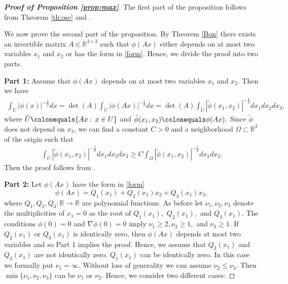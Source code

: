 \documentclass[a4paper, 11pt]{article}
\theoremstyle{plain}
\theoremstyle{definition}
\theoremstyle{lemma}
\theoremstyle{Remark}
\theoremstyle{proposition}
\theoremstyle{corollary}
\theoremstyle{example}
\theoremstyle{assumption}
\begin{document}
 \begin{proof}[\textbf{Proof of Proposition \ref{prop:max}}]
 The first part of the proposition follows from Theorem \ref{th:osc} and \cite[Theorem 1.12]{I.K.M}.


We now prove the second part of the proposition. By Theorem \ref{Bon} there exists an invertible matrix $A\in \mathbb{R}^{3\times 3}$ such that
$ \phi(Ax)$ either depends on  at most two variables $x_1$ and $x_2$ or has the form in \eqref{form}.
Hence, we divide the proof into two parts.


\bigskip
\textbf{Part 1:} Assume that $\phi(Ax) $ depends on at most two variables $x_1$ and $x_2$. Then we have
 \begin{eqnarray*}
 \int_U |\phi(x)|^{-\frac{1}{p}}dx=\det(A) \int_{\tilde{U}} |\phi(Ax)|^{-\frac{1}{p}}dx=\det(A) \int_{\tilde{U}} |\tilde{\phi}(x_1,x_2)|^{-\frac{1}{p}}dx_1dx_2dx_3,
 \end{eqnarray*}
 where $\tilde{U}\colonequals \{Ax:\, x\in U\}$ and $\tilde{\phi}(x_1,x_2)\colonequals \phi(Ax).$ Since $\tilde{\phi}$ does not depend on $x_3$, we can find a constant $C>0$ and a neighborhood $\Omega\subset \mathbb{R}^2$ of the origin such that
 \begin{eqnarray*}
 \int_{\tilde{U}} |\tilde{\phi}(x_1,x_2)|^{-\frac{1}{p}}dx_1dx_2dx_3\geq C\int_{\Omega}  |\tilde{\phi}(x_1,x_2)|^{-\frac{1}{p}}dx_1dx_2.
 \end{eqnarray*}
 Then the proof follows from \cite[Proposition 1.7]{I.K.M}.

 \bigskip
\textbf{Part 2:} Let
$ \phi(Ax)$ have the form in \eqref{form}
\begin{equation*}\label{secondcase}
\phi(Ax)=Q_1(x_1)+Q_2(x_1)x_2+Q_3(x_1)x_3,
\end{equation*}
where $Q_1, Q_2, Q_3:\mathbb{R}\to \mathbb{R}$ are polynomial functions.
As before  let $\nu_1,\nu_2,\nu_3$   denote the multiplicities of $x_1=0$ as the root  of $Q_1(x_1),$ $Q_2(x_1),$ and $Q_3(x_1).$   The conditions $\phi(0)=0$ and $\nabla \phi(0)=0$ imply $\nu_1\geq 2,\nu_2\geq 1,$ and $\nu_3\geq 1.$
If  $Q_2(x_1)$ or  $Q_3(x_1)$ is identically zero, then $\phi(Ax)$ depends at most two variables and so Part 1  implies the proof. Hence, we assume that $Q_2(x_1)$ and $Q_3(x_1)$ are not identically zero. $Q_1(x_1)$ can be identically zero. In this case we formally put $\nu_1=\infty.$
  Without loss of generality we can assume $\nu_2\leq \nu_3.$ Then  $\min\{\nu_1,\nu_2,\nu_3\}$  can be $\nu_1$ or $\nu_2.$
Hence, we consider two different cases:




\end{proof}
\end{document}
